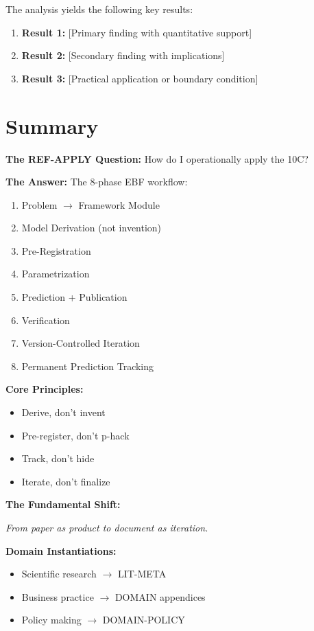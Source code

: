 The analysis yields the following key results:

\begin{enumerate}
    \item \textbf{Result 1:} [Primary finding with quantitative support]
    \item \textbf{Result 2:} [Secondary finding with implications]
    \item \textbf{Result 3:} [Practical application or boundary condition]
\end{enumerate}


\section{Summary}
\label{sec:apply-summary}

\begin{tcolorbox}[colback=green!5!white, colframe=green!75!black,
    title=\textbf{REF-APPLY Summary}]

\textbf{The REF-APPLY Question:} How do I operationally apply the 10C?

\textbf{The Answer:} The 8-phase EBF workflow:
\begin{enumerate}[nosep]
    \item Problem $\to$ Framework Module
    \item Model Derivation (not invention)
    \item Pre-Registration
    \item Parametrization
    \item Prediction + Publication
    \item Verification
    \item Version-Controlled Iteration
    \item Permanent Prediction Tracking
\end{enumerate}

\textbf{Core Principles:}
\begin{itemize}[nosep]
    \item Derive, don't invent
    \item Pre-register, don't p-hack
    \item Track, don't hide
    \item Iterate, don't finalize
\end{itemize}

\textbf{The Fundamental Shift:}
\begin{center}
\textit{From paper as product to document as iteration.}
\end{center}

\textbf{Domain Instantiations:}
\begin{itemize}[nosep]
    \item Scientific research $\to$ LIT-META
    \item Business practice $\to$ DOMAIN appendices
    \item Policy making $\to$ DOMAIN-POLICY
\end{itemize}

\end{tcolorbox}


